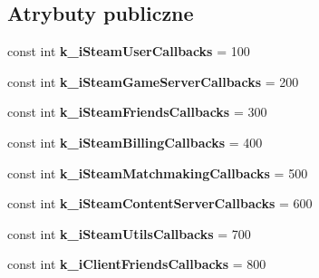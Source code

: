 \subsection*{Atrybuty publiczne}
\begin{DoxyCompactItemize}
\item 
\mbox{\label{class_valve_1_1_steamworks_1_1_steam_a_p_i_acb716d0d22fb2c7756d7030e7fad0162}} 
const int {\bfseries k\+\_\+i\+Steam\+User\+Callbacks} = 100
\item 
\mbox{\label{class_valve_1_1_steamworks_1_1_steam_a_p_i_aab9750b469baacf3f3ce13ee13dcb007}} 
const int {\bfseries k\+\_\+i\+Steam\+Game\+Server\+Callbacks} = 200
\item 
\mbox{\label{class_valve_1_1_steamworks_1_1_steam_a_p_i_a30ec6f5efbe742d22904d9ab18679c5c}} 
const int {\bfseries k\+\_\+i\+Steam\+Friends\+Callbacks} = 300
\item 
\mbox{\label{class_valve_1_1_steamworks_1_1_steam_a_p_i_a0f48a59e940d1f4d0a014b1964340d82}} 
const int {\bfseries k\+\_\+i\+Steam\+Billing\+Callbacks} = 400
\item 
\mbox{\label{class_valve_1_1_steamworks_1_1_steam_a_p_i_a358203e54e64d8882614ec95bd74fa65}} 
const int {\bfseries k\+\_\+i\+Steam\+Matchmaking\+Callbacks} = 500
\item 
\mbox{\label{class_valve_1_1_steamworks_1_1_steam_a_p_i_ad7693f6983ec1f1bbd1ef5440b1ba903}} 
const int {\bfseries k\+\_\+i\+Steam\+Content\+Server\+Callbacks} = 600
\item 
\mbox{\label{class_valve_1_1_steamworks_1_1_steam_a_p_i_a9733ffde435e289ef0c229dfd9502867}} 
const int {\bfseries k\+\_\+i\+Steam\+Utils\+Callbacks} = 700
\item 
\mbox{\label{class_valve_1_1_steamworks_1_1_steam_a_p_i_a76e7f98e3b3c7a813830fc832a51ee9b}} 
const int {\bfseries k\+\_\+i\+Client\+Friends\+Callbacks} = 800

\end{DoxyCompactItemize}
